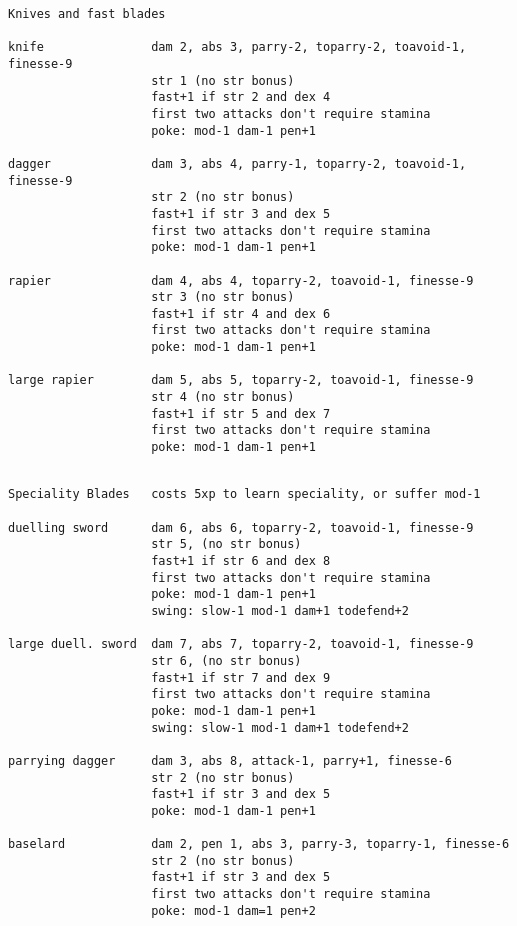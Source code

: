 \begin{verbatim}
\end{verbatim} \pagebreak[1] \begin{verbatim}
Knives and fast blades

knife               dam 2, abs 3, parry-2, toparry-2, toavoid-1, finesse-9
                    str 1 (no str bonus)
                    fast+1 if str 2 and dex 4
                    first two attacks don't require stamina
                    poke: mod-1 dam-1 pen+1

dagger              dam 3, abs 4, parry-1, toparry-2, toavoid-1, finesse-9
                    str 2 (no str bonus)
                    fast+1 if str 3 and dex 5
                    first two attacks don't require stamina
                    poke: mod-1 dam-1 pen+1

rapier              dam 4, abs 4, toparry-2, toavoid-1, finesse-9
                    str 3 (no str bonus)
                    fast+1 if str 4 and dex 6
                    first two attacks don't require stamina
                    poke: mod-1 dam-1 pen+1

large rapier        dam 5, abs 5, toparry-2, toavoid-1, finesse-9
                    str 4 (no str bonus)
                    fast+1 if str 5 and dex 7
                    first two attacks don't require stamina
                    poke: mod-1 dam-1 pen+1


\end{verbatim} \pagebreak[1] \begin{verbatim}
Speciality Blades   costs 5xp to learn speciality, or suffer mod-1

duelling sword      dam 6, abs 6, toparry-2, toavoid-1, finesse-9
                    str 5, (no str bonus)
                    fast+1 if str 6 and dex 8
                    first two attacks don't require stamina
                    poke: mod-1 dam-1 pen+1
                    swing: slow-1 mod-1 dam+1 todefend+2

large duell. sword  dam 7, abs 7, toparry-2, toavoid-1, finesse-9
                    str 6, (no str bonus)
                    fast+1 if str 7 and dex 9
                    first two attacks don't require stamina
                    poke: mod-1 dam-1 pen+1
                    swing: slow-1 mod-1 dam+1 todefend+2

parrying dagger     dam 3, abs 8, attack-1, parry+1, finesse-6
                    str 2 (no str bonus)
                    fast+1 if str 3 and dex 5
                    poke: mod-1 dam-1 pen+1

baselard            dam 2, pen 1, abs 3, parry-3, toparry-1, finesse-6
                    str 2 (no str bonus)
                    fast+1 if str 3 and dex 5
                    first two attacks don't require stamina
                    poke: mod-1 dam=1 pen+2


\end{verbatim}
